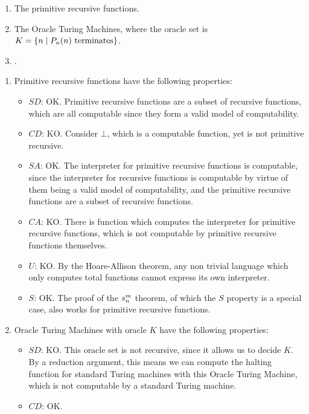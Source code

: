 \begin{enumerate}
	\item The primitive recursive functions.
	\item The Oracle Turing Machines, where the oracle set is
	\(K = \{n \mid P_n(n) \textnormal{ terminates}\}\).
	\item \java.
\end{enumerate}

\begin{solution}
\begin{enumerate}
	\item Primitive recursive functions have the following properties:
	\begin{itemize}
		\item \(SD\): OK.
		Primitive recursive functions are a subset
		of recursive functions, which are all computable
		since they form a valid model of computability.
		\item \(CD\): KO.
		Consider \(\bot\), which is a computable function,
		yet is not primitive recursive.
		\item \(SA\): OK.
		The interpreter for primitive
		recursive functions is computable,
		since the interpreter for recursive functions is computable
		by virtue of them being a valid model of computability,
		and the primitive recursive functions are a subset
		of recursive functions.
		\item \(CA\): KO.
		There is \java{} function which computes
		the interpreter for primitive recursive functions,
		which is not computable
		by primitive recursive functions themselves.
		\item \(U\): KO.
		By the Hoare-Allison theorem,
		any non trivial language which only computes total functions
		cannot express its own interpreter.
		\item \(S\): OK.
		The proof of the \(s^m_n\) theorem,
		of which the \(S\) property is a special case,
		also works for primitive recursive functions.
	\end{itemize}
	\item Oracle Turing Machines with oracle \(K\)
	have the following properties:
	\begin{itemize}
		\item \(SD\): KO.
		This oracle set is not recursive,
		since it allows us to decide \(K\).
		By a reduction argument,
		this means we can compute the halting function
		for standard Turing machines with this Oracle Turing Machine,
		which is not computable by a standard Turing machine.
		\item \(CD\): OK.

\end{itemize}
\end{enumerate}
\end{solution}
